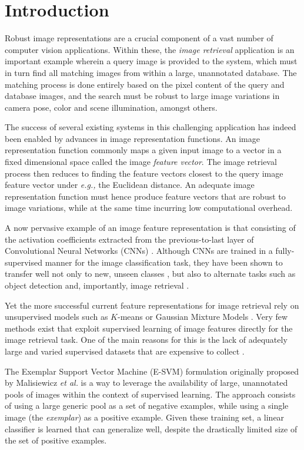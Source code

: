 \section{Introduction}

Robust image representations are a crucial component of a vast number of computer vision applications. Within these, the \emph{image retrieval} application is an important example wherein a query image is provided to the system, which must in turn find all matching images from within a large, unannotated database. The matching process is done entirely based on the pixel content of the query and database images, and the search must be robust to large image variations in camera pose, color and scene illumination, amongst others.

The success of several existing systems in this challenging application has indeed been enabled by advances in  image representation functions. An image representation function commonly maps a given input image to a vector in a fixed dimensional space called the image \emph{feature vector}. The image retrieval process then reduces to finding the feature vectors closest to the query image feature vector under {\it e.g.,} the Euclidean distance. An adequate image representation function must hence produce feature vectors that are robust to image variations, while at the same time incurring low computational overhead.

A now pervasive example of an image feature representation is that consisting of the activation coefficients extracted from the previous-to-last layer of Convolutional Neural Networks (CNNs) \cite{}. Although CNNs are trained in a fully-supervised manner for the image classification task, they have been shown to transfer well not only to new, unseen classes \cite{Oquab,Kulkarni,ChatfieldDevil}, but also to alternate tasks such as object detection \cite{RCNN} and, importantly, image retrieval \cite{AstoundingBaseline}.

Yet the more successful current feature representations for image retrieval rely on unsupervised models such as $K$-means \cite{VLAD} or Gaussian Mixture Models \cite{Fisher}. Very few methods \cite{NetVLAD,Aakanksha,Cagdas} exist that exploit supervised learning of image features directly for the image retrieval task. One of the main reasons for this is the lack of adequately large and varied supervised datasets that are expensive to collect \cite{NetVLAD}.

The Exemplar Support Vector Machine (E-SVM) formulation originally proposed by Malisiewicz {\it et al.} \cite{Malisiewicz} is a way to leverage the availability of large, unannotated pools of images within the context of supervised learning. The approach consists of using a large generic pool as a set of negative examples, while using a single image (the \emph{exemplar}) as a positive example. Given these training set, a linear classifier is learned that can  generalize well, despite the drastically limited size of the set of positive examples. 

